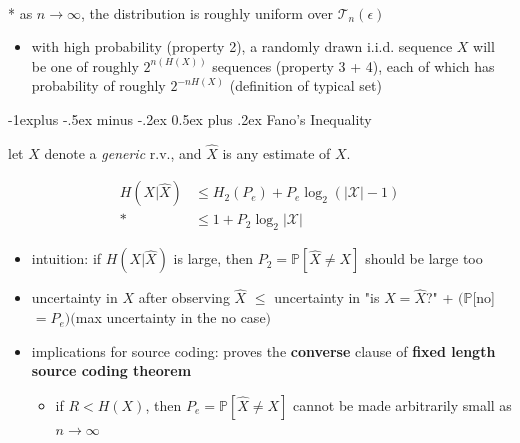 \documentclass[10pt, landscape]{article}
\makeatletter
\renewcommand{\subsection}{\@startsection{subsection}{2}{0mm}%
  {-1explus -.5ex minus -.2ex}%
  {0.5ex plus .2ex}%
{\normalfont\normalsize\bfseries}}
\makeatother
\begin{document}
\begin{multicols*}{4}
  \begin{tightcenter}
    \\* as $n \to \infty$, the distribution is roughly uniform over $\mathcal{T}_n(\epsilon)$
  \end{tightcenter}

  \begin{itemize}
    \item with high probability (property 2), a randomly drawn i.i.d. sequence $X$ will be one of roughly $2^{n(H(X))}$ sequences (property 3 + 4),
      each of which has probability of roughly $2^{-nH(X)}$ (definition of typical set)
  \end{itemize}


  \subsection{Fano's Inequality}

  let $X$ denote a \textit{generic} r.v., and $\hat{X}$ is any estimate of $X$.

  \begin{tightcenter}
    \begin{align*}
      H(X \vert \hat{X}) &\leq H_2(P_e) + P_e\log_2 (\vert\mathcal{X}\vert -1)  \\*
                         &\leq 1 + P_2 \log_2 \vert \mathcal{X} \vert
    \end{align*}
  \end{tightcenter}

  \begin{itemize}
    \item intuition: if $H(X \vert \hat{X})$ is large, then $P_2 = \mathbb{P}[\hat{X} \neq X]$ should be large too
    \item uncertainty in $X$ after observing $\hat{X}$ $\leq$ uncertainty in "is $X = \hat{X}$?" + $(\mathbb{P}$[no]$=P_e)($max uncertainty in the no case$)$
    \item implications for source coding: proves the \textbf{converse} clause of \textbf{fixed length source coding theorem}
      \begin{itemize}
        \item if $R < H(X)$, then $P_e = \mathbb{P}[\hat{X} \neq X]$ cannot be made arbitrarily small as $n \to \infty$
      \end{itemize}
  \end{itemize}



\end{multicols*}
\end{document}

